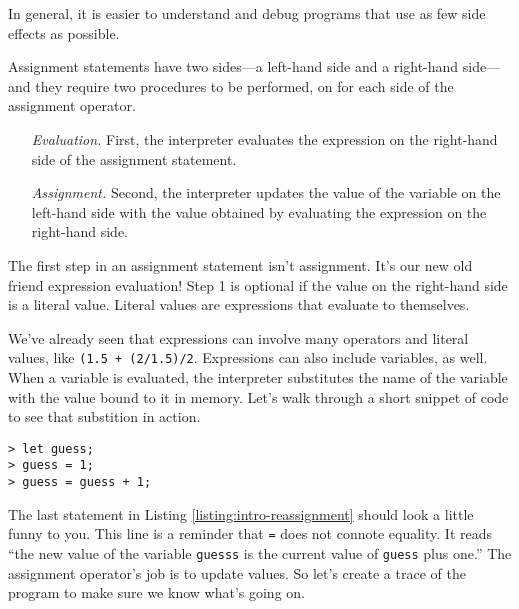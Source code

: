 \begin{center}
  In general, it is easier to understand and debug programs that use as few side effects as possible.
\end{center}

Assignment statements have two sides---a left-hand side and a right-hand side---and they require two procedures to be performed, on for each side of the assignment operator.

\begin{itemize}
  \item[\textit{Evaluation.}] First, the interpreter evaluates the expression on the right-hand side of the assignment statement.
  \item[\textit{Assignment.}] Second, the interpreter updates the value of the variable on the left-hand side with the value obtained by evaluating the expression on the right-hand side.
\end{itemize}

The first step in an assignment statement isn't assignment. It's our new old friend expression evaluation! Step 1 is optional if the value on the right-hand side is a literal value. Literal values are expressions that evaluate to themselves.

We've already seen that expressions can involve many operators and literal values, like \texttt{(1.5 + (2/1.5)/2}. Expressions can also include variables, as well. When a variable is evaluated, the interpreter substitutes the name of the variable with the value bound to it in memory. Let's walk through a short snippet of code to see that substition in action.

\begin{lstlisting}[caption={\label{listing:intro-reassignment} Proof that assignment is not equality. The updating would be clearer if we had that arrow!  \texttt{guess} $\gets$ \texttt{guess + 1;}}]
> let guess;
> guess = 1;
> guess = guess + 1;
\end{lstlisting}

The last statement in Listing \ref{listing:intro-reassignment} should look a little funny to you. This line is a reminder that \texttt{=} does not connote equality. It reads ``the new value of the variable \texttt{guesss} is the current value of \texttt{guess} plus one.'' The assignment operator's job is to update values. So let's create a trace of the program to make sure we know what's going on.

